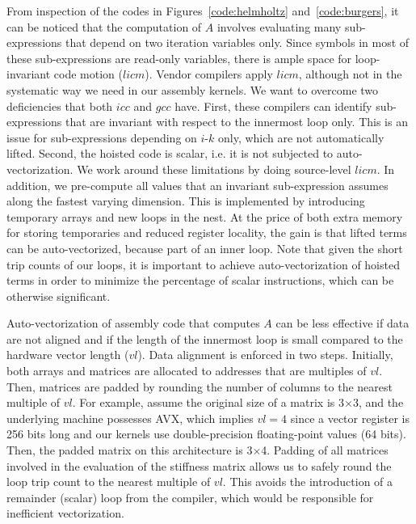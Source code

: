 \documentclass[conference]{IEEEtran}
\begin{document}
From inspection of the codes in Figures~\ref{code:helmholtz} and~\ref{code:burgers}, it can be noticed that the computation of $A$ involves evaluating many sub-expressions that depend on two iteration variables only. Since symbols in most of these sub-expressions are read-only variables, there is ample space for loop-invariant code motion ($licm$). Vendor compilers apply $licm$, although not in the systematic way we need in our assembly kernels. We want to overcome two deficiencies that both $icc$ and $gcc$ have. First, these compilers can identify sub-expressions that are invariant with respect to the innermost loop only. This is an issue for sub-expressions depending on $i$-$k$ only, which are not automatically lifted. Second, the hoisted code is scalar, i.e. it is not subjected to auto-vectorization. We work around these limitations by doing source-level $licm$. In addition, we pre-compute all values that an invariant sub-expression assumes along the fastest varying dimension. This is implemented by introducing temporary arrays and new loops in the nest. At the price of both extra memory for storing temporaries and reduced register locality, the gain is that lifted terms can be auto-vectorized, because part of an inner loop. Note that given the short trip counts of our loops, it is important to achieve auto-vectorization of hoisted terms in order to minimize the percentage of scalar instructions, which can be otherwise significant.

Auto-vectorization of assembly code that computes $A$ can be less effective if data are not aligned and if the length of the innermost loop is small compared to the hardware vector length ($vl$). Data alignment is enforced in two steps. Initially, both arrays and matrices are allocated to addresses that are multiples of $vl$. Then, matrices are padded by rounding the number of columns to the nearest multiple of $vl$. For example, assume the original size of a matrix is 3$\times$3, and the underlying machine possesses AVX, which implies $vl=4$ since a vector register is 256 bits long and our kernels use double-precision floating-point values (64 bits). Then, the padded matrix on this architecture is 3$\times$4. Padding of all matrices involved in the evaluation of the stiffness matrix allows us to safely round the loop trip count to the nearest multiple of $vl$. This avoids the introduction of a remainder (scalar) loop from the compiler, which would be responsible for inefficient vectorization. 
\end{document}
